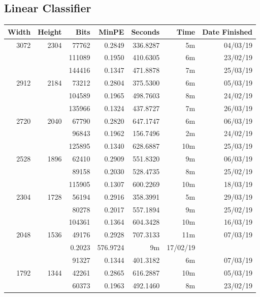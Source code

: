 \subsection{Linear Classifier}
  \begin{center}
  \begin{tabular}{ r r r | r | r r r }
  Width & Height & Bits & MinPE & Seconds & Time & Date Finished \\ \hline
  \multirow{3}{*}{3072} & \multirow{3}{*}{2304} & 77762 & 0.2849 & 336.8287 & 5m & 04/03/19 \\
  & & 111089 & 0.1950 & 410.6305 & 6m & 23/02/19 \\
  & & 144416 & 0.1347 & 471.8878 & 7m & 25/03/19 \\
  \hline
  \multirow{3}{*}{2912} & \multirow{3}{*}{2184} & 73212 & 0.2804 & 375.5300 & 6m & 05/03/19 \\
  & & 104589 & 0.1965 & 498.7603 & 8m & 24/02/19 \\
  & & 135966 & 0.1324 & 437.8727 & 7m & 26/03/19 \\
  \hline
  \multirow{3}{*}{2720} & \multirow{3}{*}{2040} & 67790 & 0.2820 & 647.1747 & 6m & 06/03/19 \\
  & & 96843 & 0.1962 & 156.7496 & 2m & 24/02/19 \\
  & & 125895 & 0.1340 & 628.6887 & 10m & 25/03/19 \\
  \hline
  \multirow{3}{*}{2528} & \multirow{3}{*}{1896} & 62410 & 0.2909 & 551.8320 & 9m & 06/03/19 \\
  & & 89158 & 0.2030 & 528.4735 & 8m & 25/02/19 \\
  & & 115905 & 0.1307 & 600.2269 & 10m & 18/03/19 \\
  \hline
  \multirow{3}{*}{2304} & \multirow{3}{*}{1728} & 56194 & 0.2916 & 358.3991 & 5m & 29/03/19 \\
  & & 80278 & 0.2017 & 557.1894 & 9m & 25/02/19 \\
  & & 104361 & 0.1364 & 604.3428 & 10m & 16/03/19 \\
  \hline
  \multirow{3}{*}{2048} & \multirow{3}{*}{1536} & 49176 & 0.2928 & 707.3133 & 11m & 07/03/19 \\
  & 70252 & 0.2023 & 576.9724 & 9m & 17/02/19 \\
  & & 91327 & 0.1344 & 401.3182 & 6m & 07/03/19 \\
  \hline
  \multirow{3}{*}{1792} & \multirow{3}{*}{1344} & 42261 & 0.2865 & 616.2887 & 10m & 05/03/19 \\
  & & 60373 & 0.1963 & 492.1460 & 8m & 23/02/19 \\

\end{tabular}
\end{center}
